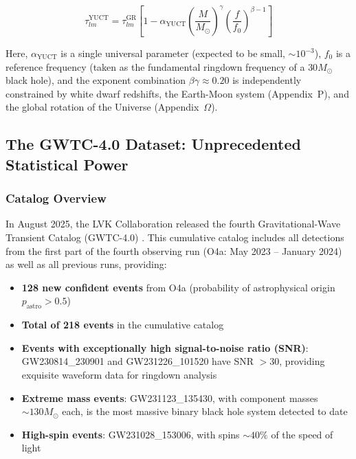 \documentclass[12pt,a4paper]{article}
\theoremstyle{remark}
\begin{document}
	\begin{equation}
		\tau_{lm}^{\text{YUCT}} = \tau_{lm}^{\text{GR}} \left[ 1 - \alpha_{\text{YUCT}} \left( \frac{M}{M_\odot} \right)^{\gamma} \left( \frac{f}{f_0} \right)^{\beta-1} \right]
		\label{eq:tau-mod}
	\end{equation}
	
Here, $\alpha_{\text{YUCT}}$ is a single universal parameter (expected to be
small, $\sim 10^{-3}$), $f_0$ is a reference frequency (taken as the fundamental
ringdown frequency of a $30 M_\odot$ black hole), and the exponent combination
$\beta\gamma \approx 0.20$ is independently constrained by white dwarf redshifts,
the Earth-Moon system (Appendix~P), and the global rotation of the Universe
(Appendix~$\Omega$).
	
	\subsection{The GWTC-4.0 Dataset: Unprecedented Statistical Power}
	
	\subsubsection{Catalog Overview}
	
	In August 2025, the LVK Collaboration released the fourth Gravitational-Wave Transient Catalog (GWTC-4.0) . This cumulative catalog includes all detections from the first part of the fourth observing run (O4a: May 2023 – January 2024) as well as all previous runs, providing:
	
	\begin{itemize}
		\item \textbf{128 new confident events} from O4a (probability of astrophysical origin $p_{\text{astro}} > 0.5$) 
		\item \textbf{Total of 218 events} in the cumulative catalog 
		\item \textbf{Events with exceptionally high signal-to-noise ratio (SNR)}: GW230814\_230901 and GW231226\_101520 have SNR $> 30$, providing exquisite waveform data for ringdown analysis 
		\item \textbf{Extreme mass events}: GW231123\_135430, with component masses $\sim 130 M_\odot$ each, is the most massive binary black hole system detected to date 
		\item \textbf{High-spin events}: GW231028\_153006, with spins $\sim 40\%$ of the speed of light 
	\end{itemize}
	
\end{document}
